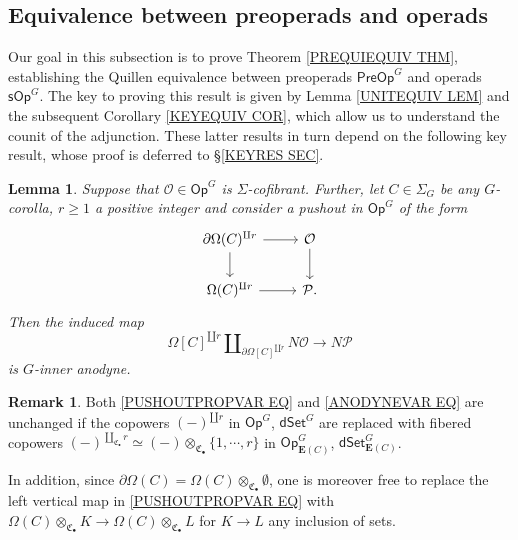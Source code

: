 \documentclass[a4paper,10pt
,draft
]{article}%
\numberwithin{equation}{section}
\numberwithin{figure}{section}
\newtheorem{lemma}[equation]{Lemma}%
\theoremstyle{definition} %
\newtheorem{remark}[equation]{Remark}%
\newcommand{\1}{\ensuremath{\mathbbm 1}}%
\begin{document}
\subsection{Equivalence between preoperads and operads}
\label{PREOPOPEQUIV SEC}

Our goal in this subsection is to prove
Theorem \ref{PREQUIEQUIV THM},
establishing the Quillen equivalence between
preoperads $\mathsf{PreOp}^G$
and operads $\mathsf{sOp}^G$.
The key to proving this result is given by 
Lemma \ref{UNITEQUIV LEM}
and the subsequent
Corollary \ref{KEYEQUIV COR},
which allow us to understand the counit of the adjunction.
These latter results in turn depend on the following key 
result, whose proof is deferred to \S \ref{KEYRES SEC}.


\begin{lemma}\label{KEYPRVAR LEM}
	Suppose that $\mathcal{O} \in \mathsf{Op}^{G}$
	is $\Sigma$-cofibrant.
	Further, let $C \in \Sigma_G$ be any $G$-corolla,
	$r \geq 1$ a positive integer and consider 
	a pushout in $\mathsf{Op}^{G}$ of the form
\begin{equation}\label{PUSHOUTPROPVAR EQ}
	\begin{tikzcd}
	\partial \Omega(C)^{\amalg r} \ar{r} \ar{d} 
	& \mathcal{O} \ar{d}
\\
	\Omega(C)^{\amalg r} \ar{r} & \mathcal{P}.
	\end{tikzcd}
\end{equation}
	Then the induced map
\begin{equation}\label{ANODYNEVAR EQ}
	\Omega[C]^{\amalg r} 
	\amalg_{\partial \Omega[C]^{\amalg r}} N\mathcal{O} \to N\mathcal{P}
\end{equation}
	is $G$-inner anodyne.
\end{lemma}

\begin{remark}\label{KEYPRVAR REM}
	Both \eqref{PUSHOUTPROPVAR EQ} and \eqref{ANODYNEVAR EQ}
	are unchanged if the copowers $(-)^{\amalg r}$ in 
	$\mathsf{Op}^G$, $\mathsf{dSet}^G$
	are replaced with fibered copowers 
	$(-)^{\amalg_{\mathfrak{C}_{\bullet}} r} \simeq 
	(-) \otimes_{\mathfrak{C}_{\bullet}} \{1,\cdots,r\}$
	in 
	$\mathsf{Op}^G_{\boldsymbol{E}(C)}$,
	$\mathsf{dSet}^G_{\boldsymbol{E}(C)}$.
	
	In addition, since 
	$\partial \Omega(C) = \Omega(C) \otimes_{\mathfrak{C}_{\bullet}} \emptyset$,
	one is moreover free to replace
	the left vertical map in \eqref{PUSHOUTPROPVAR EQ}
	with 
	$\Omega(C) \otimes_{\mathfrak{C}_{\bullet}} K
	\to
	\Omega(C) \otimes_{\mathfrak{C}_{\bullet}} L$
	for $K\to L$ any inclusion of sets.
\end{remark}
\end{document}
